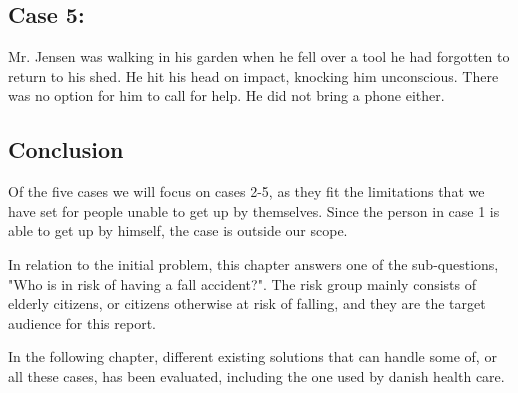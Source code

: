 \subsection{Case 5:}
Mr. Jensen was walking in his garden when he fell over a tool he had forgotten to return to his shed. He hit his head on impact, knocking him unconscious. There was no option for him to call for help. He did not bring a phone either.

\subsection{Conclusion}
Of the five cases we will focus on cases 2-5, as they fit the limitations that we have set for people unable to get up by themselves. Since the person in case 1 is able to get up by himself, the case is outside our scope.

In relation to the initial problem, this chapter answers one of the sub-questions, "Who is in risk of having a fall accident?".
The risk group mainly consists of elderly citizens, or citizens otherwise at risk of falling, and they are the target audience for this report.

In the following chapter, different existing solutions that can handle some of, or all these cases, has been evaluated, including the one used by danish health care.